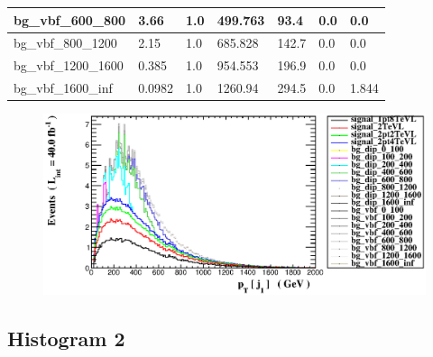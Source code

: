 \documentclass[a4paper, 10pt]{article}
\begin{document}
\begin{table}[H]
\begin{center}
\begin{tabular}{|m{23.0mm}|m{23.0mm}|m{18.0mm}|m{19.0mm}|m{19.0mm}|m{19.0mm}|m{19.0mm}|}
      \hline
      {\cellcolor{white}         bg\_vbf\_600\_800}& {\cellcolor{white}         3.66}& {\cellcolor{white}         1.0}& {\cellcolor{white}         499.763}& {\cellcolor{white}         93.4}& {\cellcolor{green}         0.0}& {\cellcolor{green}         0.0}\\
      \hline
      {\cellcolor{white}         bg\_vbf\_800\_1200}& {\cellcolor{white}         2.15}& {\cellcolor{white}         1.0}& {\cellcolor{white}         685.828}& {\cellcolor{white}         142.7}& {\cellcolor{green}         0.0}& {\cellcolor{green}         0.0}\\
      \hline
      {\cellcolor{white}         bg\_vbf\_1200\_1600}& {\cellcolor{white}         0.385}& {\cellcolor{white}         1.0}& {\cellcolor{white}         954.553}& {\cellcolor{white}         196.9}& {\cellcolor{green}         0.0}& {\cellcolor{green}         0.0}\\
      \hline
      {\cellcolor{white}         bg\_vbf\_1600\_inf}& {\cellcolor{white}         0.0982}& {\cellcolor{white}         1.0}& {\cellcolor{white}         1260.94}& {\cellcolor{white}         294.5}& {\cellcolor{green}         0.0}& {\cellcolor{green}         1.844}\\
\hline
    \end{tabular}
  \end{center}
\end{table}

\begin{figure}[H]
  \begin{center}
    \includegraphics[scale=0.45]{selection_0.eps}\\
\caption{   }
  \end{center}
\end{figure}
      \newpage
\subsection{ Histogram 2}
\end{document}

